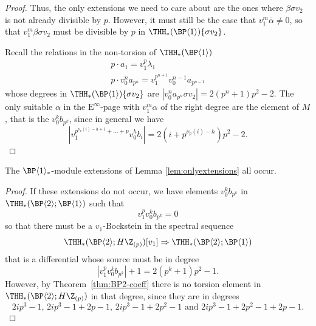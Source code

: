 \begin{proof}
  Thus, the only extensions we need to care about are the ones where $\beta \sigma v_2$ is not already divisible by $p$. However, it must still be the case that $v_1^m \bar{\alpha} \neq 0$, so that $v_1^m \beta \sigma v_2$ must be divisible by $p$ in $\THH_*(\BP \langle 1 \rangle)\{\sigma v_2\}$.

  Recall the relations in the non-torsion of $\THH_*(\BP \langle 1 \rangle)$
  \begin{equation}
    \begin{gathered}
      p\cdot a_1 = v_1^p \lambda_1 \\
      p\cdot v_0^n a_{p^n} = v_1^{p^{n+1}}v_0^{n-1} a_{p^{n-1}}
    \end{gathered}
  \end{equation}
  whose degrees in $\THH_*(\BP \langle 1 \rangle)\{ \sigma v_2\}$ are $|v_0^n a_{p^n}\sigma v_2| = 2(p^n + 1)p^2 - 2$. The only suitable $\alpha$ in the $\mathrm{E}^\infty$-page with $v_1^m \alpha$ of the right degree are the element of $M$, that is the $v_0^k b_{p^k}$, since in general we have
  \begin{equation}
    |v_1^{p^{\nu_p(i) - h + 1 } + \dots + p} v_0^h b_i| = 2(i + p^{\nu_p(i) - h})p^2 - 2.
  \end{equation}
\end{proof}

\begin{proposition}
  The $\BP\langle 1\rangle_*$-module extensions of Lemma \ref{lem:onlyextensions} all occur. 
\end{proposition}

\begin{proof}
  If these extensions do not occur, we have elements $v_0^k b_{p^k}$ in $\THH_*(\BP \langle 2 \rangle ; \BP \langle 1 \rangle)$ such that
  \begin{equation}
    v_1^p v_0^k b_{p^k} = 0
  \end{equation}
  so that there must be a $v_1$-Bockstein in the spectral sequence
  \begin{equation}
    \THH_*(\BP \langle 2 \rangle ; H\Z_{(p)})[v_1] \Rightarrow \THH_*(\BP \langle 2 \rangle ; \BP \langle 1 \rangle)
  \end{equation}
  that is a differential whose source must be in degree
  \begin{equation}
    |v_1^p v_0^k b_{p^k}| + 1 = 2(p^k + 1)p^2 - 1.
  \end{equation}
  However, by Theorem~\ref{thm:BP2-coeff} there is no torsion element in $\THH_*(\BP \langle 2 \rangle; H\Z_{(p)})$ in that degree, since they are in degrees
  \begin{equation}
    2ip^3 - 1 ,\, 2ip^3 - 1 + 2p - 1,\, 2ip^3 - 1 + 2p^2 - 1 \text{ and } 2ip^3 - 1 + 2p^2 - 1 + 2p - 1.
  \end{equation}
\end{proof}

